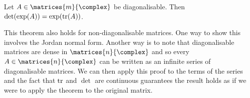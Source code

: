 \begin{lma}{}{}
    Let \(A \in \matrices{m}{\complex}\) be diagonalisable.
    Then \(\det(\exp(A)) = \exp(\operatorname{tr}(A))\).
    
    \begin{rmk}
        This theorem also holds for non-diagonalisable matrices.
        One way to show this involves the Jordan normal form.
        Another way is to note that diagonalisable matrices are dense in \(\matrices{n}{\complex}\) and so every \(A \in \matrices{n}{\complex}\) can be written as an infinite series of diagonalisable matrices.
        We can then apply this proof to the terms of the series and the fact that \(\operatorname{tr}\) and \(\det\) are continuous guarantees the result holds as if we were to apply the theorem to the original matrix.
    \end{rmk}
    

\end{lma}
